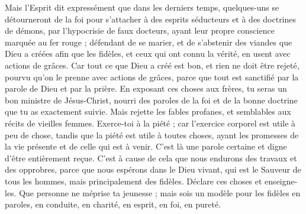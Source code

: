 \begin{multicols}{2}
\VerseOne{}Mais l'Esprit dit expressément que dans les derniers temps, quelques-uns se détourneront de la foi pour s’attacher à des esprits séducteurs et à des doctrines de démons,
par l’hypocrisie de faux docteurs, ayant leur propre conscience marquée au fer rouge ;
défendant de se marier, et de s'abstenir des viandes que Dieu a créées afin que les fidèles, et ceux qui ont connu la vérité, en usent avec actions de grâces.
Car tout ce que Dieu a créé est bon, et rien ne doit être rejeté, pourvu qu’on le prenne avec actions de grâces,
parce que tout est sanctifié par la parole de Dieu et par la prière.
En exposant ces choses aux frères, tu seras un bon ministre de Jésus-Christ, nourri des paroles de la foi et de la bonne doctrine que tu as exactement suivie.
Mais rejette les fables profanes, et semblables aux récits de vieilles femmes.
Exerce-toi à la piété ; car l'exercice corporel est utile à peu de chose, tandis que la piété est utile à toutes choses, ayant les promesses de la vie présente et de celle qui est à venir.
C'est là une parole certaine et digne d'être entièrement reçue.
C’est à cause de cela que nous endurons des travaux et des opprobres, parce que nous espérons dans le Dieu vivant, qui est le Sauveur de tous les hommes, mais principalement des fidèles.
Déclare ces choses et enseigne-les.
Que personne ne méprise ta jeunesse ; mais sois un modèle pour les fidèles en paroles, en conduite, en charité, en esprit, en foi, en pureté.

\end{multicols}
